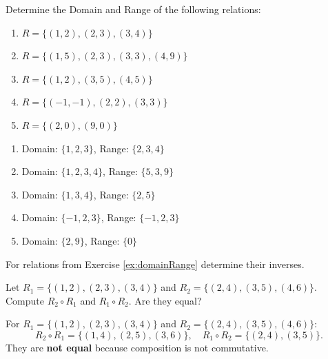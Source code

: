\documentclass[11pt,paper=b5,footinclude,headinclude]{scrbook} %
\theoremstyle{remark}
\theoremstyle{definition} %
\theoremstyle{theorem} %
\newtheorem{ex}{Exercise\hypertarget{sol:\theex}}[chapter]
\begin{document}
\begin{ex}\label{ex:domainRange}
    Determine the Domain and Range of the following relations:
    \begin{enumerate}
    \item \(R = \{(1, 2), (2, 3), (3, 4)\}\)
    \item \(R = \{(1, 5), (2, 3), (3, 3), (4, 9)\}\)
    \item \(R = \{(1, 2), (3, 5), (4, 5)\}\)
    \item \(R = \{(-1, -1), (2, 2), (3, 3)\}\)
    \item \(R = \{(2, 0), (9, 0)\}\)
\end{enumerate}
\begin{sol}
    \begin{enumerate}
    \item Domain: \(\{1, 2, 3\}\), Range: \(\{2, 3, 4\}\)
    \item Domain: \(\{1, 2, 3, 4\}\), Range: \(\{5, 3, 9\}\)
    \item Domain: \(\{1, 3, 4\}\), Range: \(\{2, 5\}\)
    \item Domain: \(\{-1, 2, 3\}\), Range: \(\{-1, 2, 3\}\)
    \item Domain: \(\{2, 9\}\), Range: \(\{0\}\)
\end{enumerate}

\end{sol}
\end{ex}
\begin{ex}
    For relations from Exercise \ref{ex:domainRange} determine their inverses.
\end{ex}

\begin{ex}
    Let \(R_1 = \{(1, 2), (2, 3), (3, 4)\}\) and \(R_2 = \{(2, 4), (3, 5), (4, 6)\}\). Compute \(R_2 \circ R_1\) and \(R_1 \circ R_2\). Are they equal?

    \begin{sol}
        For \(R_1 = \{(1, 2), (2, 3), (3, 4)\}\) and \(R_2 = \{(2, 4), (3, 5), (4, 6)\}\):
    \[
    R_2 \circ R_1 = \{(1, 4), (2, 5), (3, 6)\}, \quad R_1 \circ R_2 = \{(2, 4), (3, 5)\}.
    \]
    They are \textbf{not equal} because composition is not commutative.
    \end{sol}
\end{ex}
\end{document}
